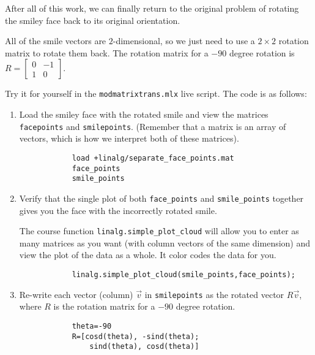 \documentclass{ximera}
\begin{document}
    \begin{example}

        After all of this work, we can finally return to the original problem of rotating the smiley face back to its original orientation.

        All of the smile vectors are $2$-dimensional, so we just need to use a $2\times 2$ rotation matrix to rotate them back. The rotation matrix for a $-90$ degree rotation is $R=\begin{bmatrix} 0 & -1 \\ 1 & 0 \end{bmatrix}$.

        Try it for yourself in the \texttt{mod\textunderscore matrix\textunderscore trans.mlx} live script. The code is as follows:
        \begin{enumerate}

            \item Load the smiley face with the rotated smile and view the matrices \texttt{face\textunderscore points} and \texttt{smile\textunderscore points}. (Remember that a matrix is an array of vectors, which is how we interpret both of these matrices).
            \begin{verbatim}
            load +linalg/separate_face_points.mat
            face_points
            smile_points
            \end{verbatim}

            \item Verify that the single plot of both \texttt{face\_points} and \texttt{smile\_points} together gives you the face with the incorrectly rotated smile. 

            The course function \texttt{linalg.simple_plot_cloud} will allow you to enter as many matrices as you want (with column vectors of the same dimension) and view the plot of the data as a whole. It color codes the data for you.

            \begin{verbatim}
            linalg.simple_plot_cloud(smile_points,face_points);
            \end{verbatim}

            \item Re-write each vector (column) $\vec{v}$ in \texttt{smile\textunderscore points} as the rotated vector $R\vec{v}$, where $R$ is the rotation matrix for a $-90$ degree rotation.
            
            \begin{verbatim}
            theta=-90
            R=[cosd(theta), -sind(theta);
                sind(theta), cosd(theta)]
            

\end{verbatim}
\end{enumerate}
\end{example}
\end{document}

